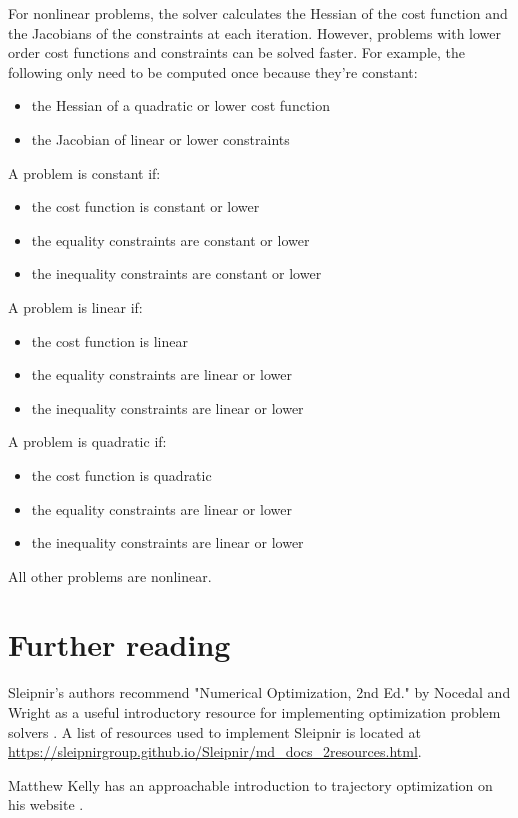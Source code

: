 For nonlinear problems, the solver calculates the Hessian of the cost function
and the Jacobians of the constraints at each iteration. However, problems with
lower order cost functions and constraints can be solved faster. For example,
the following only need to be computed once because they're constant:
\begin{itemize}
  \item the Hessian of a quadratic or lower cost function
  \item the Jacobian of linear or lower constraints
\end{itemize}

A problem is constant if:
\begin{itemize}
  \item the cost function is constant or lower
  \item the equality constraints are constant or lower
  \item the inequality constraints are constant or lower
\end{itemize}

A problem is linear if:
\begin{itemize}
  \item the cost function is linear
  \item the equality constraints are linear or lower
  \item the inequality constraints are linear or lower
\end{itemize}

A problem is quadratic if:
\begin{itemize}
  \item the cost function is quadratic
  \item the equality constraints are linear or lower
  \item the inequality constraints are linear or lower
\end{itemize}

All other problems are nonlinear.

\section{Further reading}

Sleipnir's authors recommend "Numerical Optimization, 2nd Ed." by Nocedal and
Wright as a useful introductory resource for implementing optimization problem
solvers \cite{bib:numerical_optimization}. A list of resources used to implement
Sleipnir is located at
\url{https://sleipnirgroup.github.io/Sleipnir/md_docs_2resources.html}.

Matthew Kelly has an approachable introduction to trajectory optimization on his
website \cite{bib:intro_to_traj_opt}.
